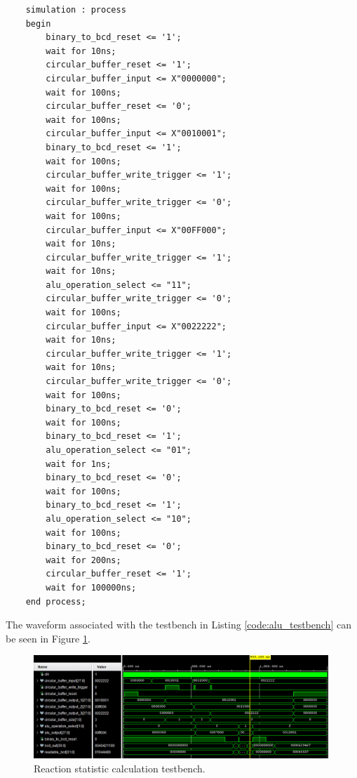 \documentclass[11pt]{article}
\newenvironment{code}{\captionsetup{type=listing}}{}
\begin{document}
\begin{code}
\begin{verbatim}
    simulation : process
    begin
        binary_to_bcd_reset <= '1';
        wait for 10ns;
        circular_buffer_reset <= '1';
        circular_buffer_input <= X"0000000";
        wait for 100ns;
        circular_buffer_reset <= '0';
        wait for 100ns;
        circular_buffer_input <= X"0010001";
        binary_to_bcd_reset <= '1';
        wait for 100ns;
        circular_buffer_write_trigger <= '1';
        wait for 100ns;
        circular_buffer_write_trigger <= '0';
        wait for 100ns;
        circular_buffer_input <= X"00FF000";
        wait for 10ns;
        circular_buffer_write_trigger <= '1';
        wait for 10ns;
        alu_operation_select <= "11";
        circular_buffer_write_trigger <= '0';
        wait for 100ns;
        circular_buffer_input <= X"0022222";
        wait for 10ns;
        circular_buffer_write_trigger <= '1';
        wait for 10ns;
        circular_buffer_write_trigger <= '0';
        wait for 100ns;
        binary_to_bcd_reset <= '0';
        wait for 100ns;
        binary_to_bcd_reset <= '1';
        alu_operation_select <= "01";
        wait for 1ns;
        binary_to_bcd_reset <= '0';
        wait for 100ns;
        binary_to_bcd_reset <= '1';
        alu_operation_select <= "10";
        wait for 100ns;
        binary_to_bcd_reset <= '0';
        wait for 200ns;
        circular_buffer_reset <= '1';
        wait for 100000ns;
    end process;

  \end{verbatim}
	\captionsetup{belowskip=0pt}
	\label{code:alu_testbench}
\end{code}

\vspace*{1cm}

The waveform associated with the testbench in Listing \ref{code:alu_testbench} can be seen in Figure \ref{fig:alu_testbench_2}.

\begin{figure}[H]
	\centering
	\includegraphics[width=0.99\textwidth]{thing.jpeg}
	\caption{Reaction statistic calculation testbench.}
	\label{fig:alu_testbench_2}
\end{figure}

\newpage


\end{document}
